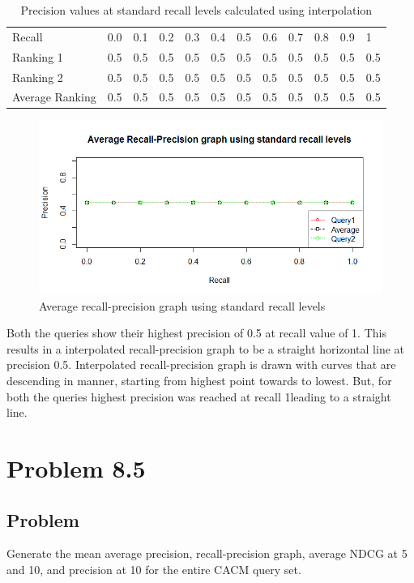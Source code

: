 \documentclass[12pt]{report}
\begin{document}
\begin{table}[]
\centering
\caption{Precision values at standard recall levels calculated using interpolation}
\label{my-label}
\begin{tabular}{llllllllllll}
Recall          & 0.0   & 0.1   & 0.2   & 0.3   & 0.4   & 0.5   & 0.6   & 0.7   & 0.8  & 0.9  & 1    \\
Ranking 1       & 0.5     & 0.5     & 0.5     & 0.5   & 0.5   & 0.5   & 0.5 & 0.5 & 0.5  & 0.5  & 0.5  \\
Ranking 2       & 0.5     & 0.5     & 0.5     & 0.5   & 0.5   & 0.5   & 0.5 & 0.5 & 0.5  & 0.5  & 0.5  \\
Average Ranking  & 0.5     & 0.5     & 0.5     & 0.5   & 0.5   & 0.5   & 0.5 & 0.5 & 0.5  & 0.5  & 0.5  \\
\end{tabular}
\end{table}

\begin{figure}[ht]
  \centering
  \includegraphics[width=1\textwidth]{Problem8_4/Averagerecallprecision.png}
  \caption{Average recall-precision graph using standard recall levels}
  \label{fig:1}
\end{figure}

Both the queries show their highest precision of 0.5 at recall value of 1. This results in a interpolated recall-precision graph to be a straight horizontal line at precision 0.5. Interpolated recall-precision graph is drawn with curves that are descending in manner, starting from highest point towards to lowest. But, for both the queries highest precision was reached at recall 1leading to a straight line.

\chapter{Problem 8.5}
\section{Problem}
Generate the mean average precision, recall-precision graph, average NDCG at 5 and 10, and precision at 10 for the entire CACM query set.
\end{document}
